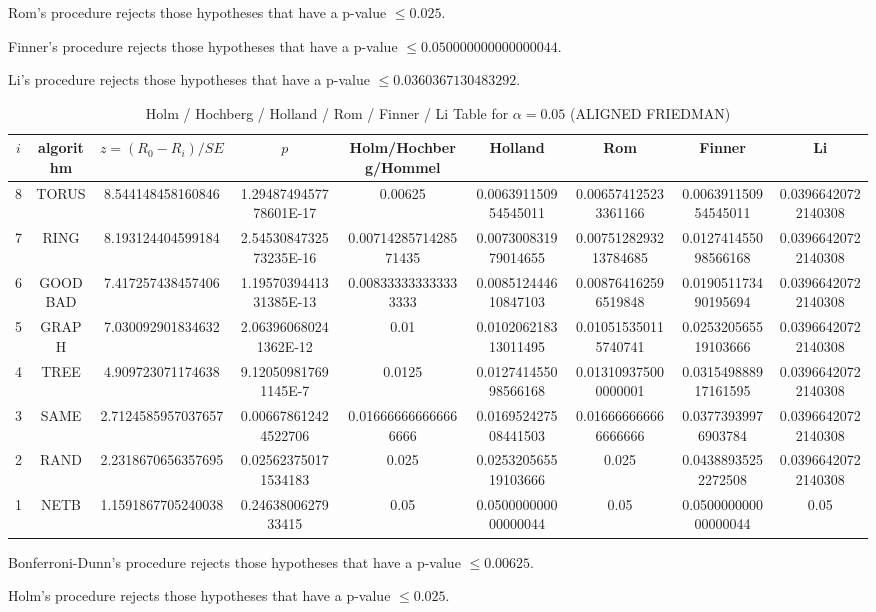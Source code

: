 \documentclass[a4paper,10pt]{article}
\begin{document}
\begin{landscape}
Rom's procedure rejects those hypotheses that have a p-value $\le0.025$.


Finner's procedure rejects those hypotheses that have a p-value $\le0.050000000000000044$.


Li's procedure rejects those hypotheses that have a p-value $\le0.0360367130483292$.



\newpage

\begin{table}[!htp]
\centering\scriptsize
\caption{Holm / Hochberg / Holland / Rom / Finner / Li Table for $\alpha=0.05$ (ALIGNED FRIEDMAN)}
\begin{tabular}{ccccccccc}
$i$&algorithm&$z=(R_0 - R_i)/SE$&$p$&Holm/Hochberg/Hommel&Holland&Rom&Finner&Li\\
\hline
8& TORUS&8.544148458160846&1.2948749457778601E-17&0.00625&0.006391150954545011&0.006574125233361166&0.006391150954545011&0.03966420722140308\\
7& RING&8.193124404599184&2.5453084732573235E-16&0.0071428571428571435&0.007300831979014655&0.0075128293213784685&0.012741455098566168&0.03966420722140308\\
6& GOODBAD&7.417257438457406&1.1957039441331385E-13&0.008333333333333333&0.008512444610847103&0.008764162596519848&0.019051173490195694&0.03966420722140308\\
5& GRAPH&7.030092901834632&2.063960680241362E-12&0.01&0.010206218313011495&0.010515350115740741&0.025320565519103666&0.03966420722140308\\
4& TREE&4.909723071174638&9.120509817691145E-7&0.0125&0.012741455098566168&0.013109375000000001&0.031549888917161595&0.03966420722140308\\
3& SAME&2.7124585957037657&0.006678612424522706&0.016666666666666666&0.016952427508441503&0.016666666666666666&0.03773939976903784&0.03966420722140308\\
2& RAND&2.2318670656357695&0.025623750171534183&0.025&0.025320565519103666&0.025&0.04388935252272508&0.03966420722140308\\
1& NETB&1.1591867705240038&0.2463800627933415&0.05&0.050000000000000044&0.05&0.050000000000000044&0.05\\
\hline
\end{tabular}
\end{table}
Bonferroni-Dunn's procedure rejects those hypotheses that have a p-value $\le0.00625$.


Holm's procedure rejects those hypotheses that have a p-value $\le0.025$.



\end{landscape}
\end{document}

